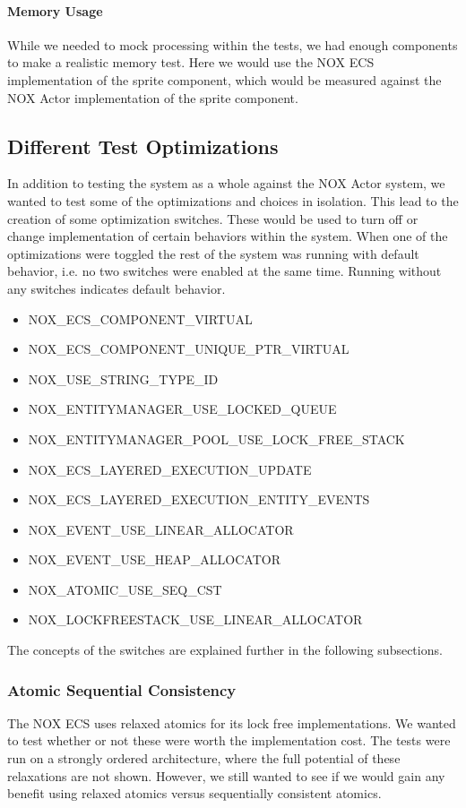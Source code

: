 \paragraph{Memory Usage}
While we needed to mock processing within the tests, we had enough components to make a realistic memory test.
Here we would use the NOX ECS implementation of the sprite component, which would be measured against
the NOX Actor implementation of the sprite component.

\subsection{Different Test Optimizations}
In addition to testing the system as a whole against the NOX Actor system, we wanted
to test some of the optimizations and choices in isolation.
This lead to the creation of some optimization switches.
These would be used to turn off or change implementation of certain behaviors within
the system.
When one of the optimizations were toggled the rest of the system was running with
default behavior, i.e. no two switches were enabled at the same time.
Running without any switches indicates default behavior.
\begin{itemize}
    \item NOX\_ECS\_COMPONENT\_VIRTUAL
    \item NOX\_ECS\_COMPONENT\_UNIQUE\_PTR\_VIRTUAL
    \item NOX\_USE\_STRING\_TYPE\_ID
    \item NOX\_ENTITYMANAGER\_USE\_LOCKED\_QUEUE
    \item NOX\_ENTITYMANAGER\_POOL\_USE\_LOCK\_FREE\_STACK
    \item NOX\_ECS\_LAYERED\_EXECUTION\_UPDATE
    \item NOX\_ECS\_LAYERED\_EXECUTION\_ENTITY\_EVENTS
    \item NOX\_EVENT\_USE\_LINEAR\_ALLOCATOR
    \item NOX\_EVENT\_USE\_HEAP\_ALLOCATOR
    \item NOX\_ATOMIC\_USE\_SEQ\_CST
    \item NOX\_LOCKFREESTACK\_USE\_LINEAR\_ALLOCATOR
\end{itemize}
The concepts of the switches are explained further in the following subsections.

\subsubsection{Atomic Sequential Consistency}
The NOX ECS uses relaxed atomics for its lock free implementations. We wanted to test
whether or not these were worth the implementation cost.
The tests were run on a strongly ordered architecture\cite{preshing_weak_vs_strong_memory_models}, where the
full potential of these relaxations are not shown. However, we still wanted to see
if we would gain any benefit using relaxed atomics versus sequentially consistent atomics.

